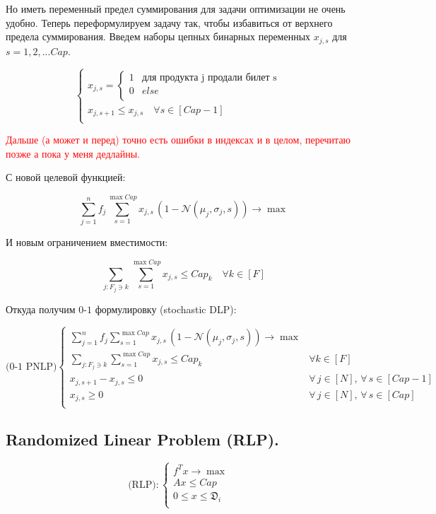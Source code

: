 \documentclass[reqno]{article}
\theoremstyle{definition}
\theoremstyle{definition}
\theoremstyle{definition}
\theoremstyle{definition}
\theoremstyle{definition}
\theoremstyle{definition}
\theoremstyle{definition}
\theoremstyle{definition}
\theoremstyle{definition}
\begin{document}
		Но иметь переменный предел суммирования для задачи оптимизации не очень удобно. Теперь переформулируем задачу так, чтобы избавиться от верхнего предела суммирования. Введем наборы цепных бинарных переменных $x_{j,s}$ для $s = 1, 2, ... Cap$.
		
		$$
		\begin{cases}
			x_{j,s} =
		\begin{cases}
			1 & \text{для продукта j продали билет s}\\
			0 & else\\
		\end{cases} & \\
		x_{j,s + 1} \leq x_{j, s}\quad \forall s \in [Cap - 1] & \\
		\end{cases}
		$$
		
		\textcolor{red}{Дальше (а может и перед) точно есть ошибки в индексах и в целом, перечитаю позже а пока у меня дедлайны.}
		
		С новой целевой функцией:
		
		$$\sum\limits^n_{j = 1} f_j \sum\limits^{\max Cap}_{s = 1} x_{j, s}\,(1 - \mathcal{N}(\mu_j, \sigma_j, s)) \rightarrow \max$$
		
		И новым ограничением вместимости:
		
		$$\sum\limits_{j : F_j \ni k} \sum\limits^{\max Cap}_{s = 1} x_{j, s} \leq Cap_k \quad \forall k \in [F]$$
		
		Откуда получим $0$-$1$ формулировку (stochastic DLP):
		
		$$
		\text{(0-1 PNLP)}
		\begin{cases}
			\sum\limits^n_{j = 1} f_j \sum\limits^{\max Cap}_{s = 1} x_{j, s}\,(1 - \mathcal{N}(\mu_j, \sigma_j, s)) \rightarrow \max & \\
			\sum\limits_{j : F_j \ni k} \sum\limits^{\max Cap}_{s = 1} x_{j, s} \leq Cap_k & \forall k \in [F] \\
			x_{j,s + 1} - x_{j, s} \leq 0 \quad & \forall\, j \in [N],\, \forall\, s \in [Cap - 1] \\
			x_{j, s} \geq 0 &  \forall\, j \in [N],\, \forall\, s \in [Cap] \\
		\end{cases}
		$$
		
		\subsection{Randomized Linear Problem (RLP).}
		
		$$
		\text{(RLP)}:
		\begin{cases}
			f^Tx \rightarrow \max & \\
			Ax \leq Cap & \\
			0 \leq x \leq \mathfrak{D}_i & \\
		\end{cases}	
		$$
		
\end{document}
